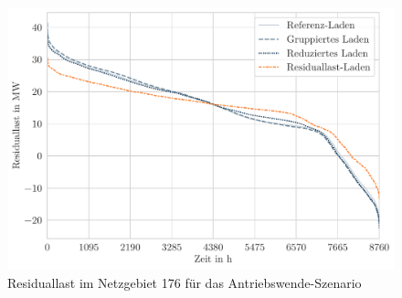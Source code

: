 \begin{figure}[H]
    \centering
    \includegraphics[width=\textwidth]{Bilder/example_resiual_load}
    \caption{Residuallast im Netzgebiet \num{176} für das Antriebswende-Szenario}\label{fig:residual_load}
\end{figure}